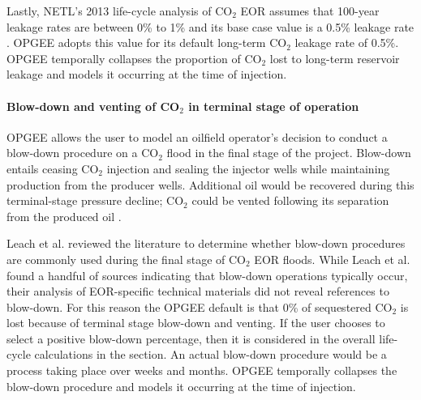 \documentclass[11pt]{report}
\begin{document}
Lastly, NETL's 2013 life-cycle analysis of CO$_2$ EOR assumes that 100-year leakage rates are between 0\% to 1\% and its base case value is a 0.5\% leakage rate \cite{NETL2013}. OPGEE adopts this value for its default long-term CO$_2$ leakage rate of 0.5\%. OPGEE temporally collapses the proportion of CO$_2$ lost to long-term reservoir leakage and models it occurring at the time of injection.  

\paragraph{Blow-down and venting of CO$_2$ in terminal stage of operation} \label{par:Blowdown}
OPGEE allows the user to model an oilfield operator's decision to conduct a blow-down procedure on a CO$_2$ flood in the final stage of the project. Blow-down entails ceasing CO$_2$ injection and sealing the injector wells while maintaining production from the producer wells. Additional oil would be recovered during this terminal-stage pressure decline; CO$_2$ could be vented following its separation from the produced oil \cite{Stevens1999}. 

Leach et al. \cite{Leach2011} reviewed the literature to determine whether blow-down procedures are commonly used during the final stage of CO$_2$ EOR floods. While Leach et al. \cite{Leach2011} found a handful of sources indicating that blow-down operations typically occur, their analysis of EOR-specific technical materials did not reveal references to blow-down. For this reason the OPGEE default is that 0\% of sequestered CO$_2$ is lost because of terminal stage blow-down and venting. If the user chooses to select a positive blow-down percentage, then it is considered in the overall life-cycle calculations in the  section. An actual blow-down procedure would be a process taking place over weeks and months. OPGEE temporally collapses the blow-down procedure and models it occurring at the time of injection.  
\end{document}
